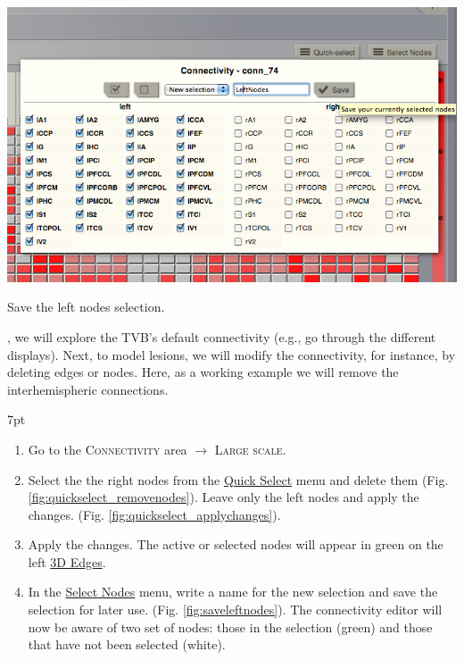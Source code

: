 \documentclass{tufte-handout}
\newenvironment{formal}{%
  \def\FrameCommand{%
    \hspace{1pt}%
    {\color{DarkBlue}\vrule width 2pt}%
    {\color{formalshade}\vrule width 4pt}%
    \colorbox{formalshade}%
  }%
  \MakeFramed{\advance\hsize-\width\FrameRestore}%
  \noindent\hspace{-4.55pt}%
  \begin{adjustwidth}{}{7pt}%
  \vspace{2pt}\vspace{2pt}%
}
{%
  \vspace{2pt}\end{adjustwidth}\endMakeFramed%
}
\begin{document}
\begin{marginfigure}%
  \includegraphics[width=\linewidth]{Handout_UI_ModellingStructuralLesions_SaveLeftNodes}%
  \caption{Save the left nodes selection.}%
  \label{fig:saveleftnodes}%
\end{marginfigure}%
, we will explore the TVB's default connectivity (e.g., go through
the different displays). Next, to model lesions, we will modify the connectivity, for
instance, by deleting edges or nodes. Here, as a working example we will remove the
interhemispheric connections. 

\begin{formal}
  \begin{enumerate}
  \item Go to the \textsc{Connectivity} area $\rightarrow$ \textsc{Large scale}.
  \item Select the the right nodes from the \underline{Quick Select} menu and delete them (Fig. \ref{fig:quickselect_removenodes}). Leave only the left nodes and apply the changes. (Fig. \ref{fig:quickselect_applychanges}). 
  \item Apply the changes. The active or selected nodes will appear in green on the left \underline{3D Edges}. 
  \item In the \underline{Select Nodes} menu, write a name for the new selection and save the selection for later use. (Fig. \ref{fig:saveleftnodes}). The connectivity editor will now be aware of two set of nodes: those in the selection (green) and those that have not been selected (white).
  \end{enumerate}
\end{formal}

\newpage
\end{document}
